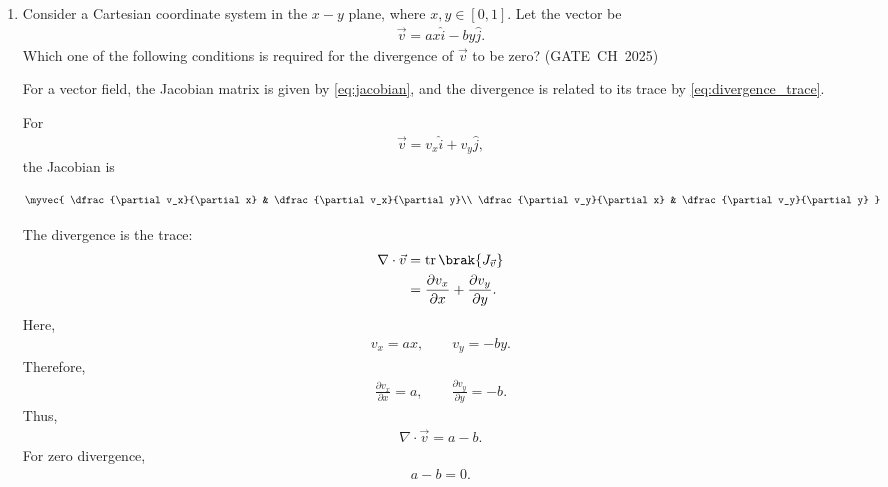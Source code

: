 \begin{enumerate}[label=\thesubsection.\arabic*, ref=\thesubsection.\theenumi,itemsep=0pt]
\item Consider a Cartesian coordinate system in the $x-y$ plane, where $x,y\in[0,1]$. Let the vector be
\begin{align}
\vec{v}=ax\hat{i}-by\hat{j}.
\end{align}
Which one of the following conditions is required for the divergence of $\vec{v}$ to be zero? \hfill (GATE~CH~2025)
\begin{enumerate}[itemsep=0pt]
\end{enumerate}

\solution For a vector field, the Jacobian matrix is given by \eqref{eq:jacobian}, and the divergence is related to its trace by \eqref{eq:divergence_trace}.

For
\begin{align}
\vec{v}=v_x\hat{i}+v_y\hat{j},
\end{align}
the Jacobian is

\begin{align}
\begingroup
\setlength{\arraycolsep}{2pt}
\renewcommand{\arraystretch}{1.8}
\myvec{
\dfrac{\partial v_x}{\partial x} &
\dfrac{\partial v_x}{\partial y}\\
\dfrac{\partial v_y}{\partial x} &
\dfrac{\partial v_y}{\partial y}
}
\endgroup
\end{align}

The divergence is the trace:
\begin{align}
\nabla\cdot\vec{v}
&=\operatorname{tr}\brak{J_{\vec{v}}}\\
&=\frac{\partial v_x}{\partial x}+\frac{\partial v_y}{\partial y}.
\end{align}
Here,
\begin{align}
v_x=ax,\qquad v_y=-by.
\end{align}
Therefore,
\begin{align}
\frac{\partial v_x}{\partial x}=a,
\qquad
\frac{\partial v_y}{\partial y}=-b.
\end{align}
Thus,
\begin{align}
\nabla\cdot\vec{v}=a-b.
\end{align}
For zero divergence,
\begin{align}
a-b=0.
\end{align}


\end{enumerate}
